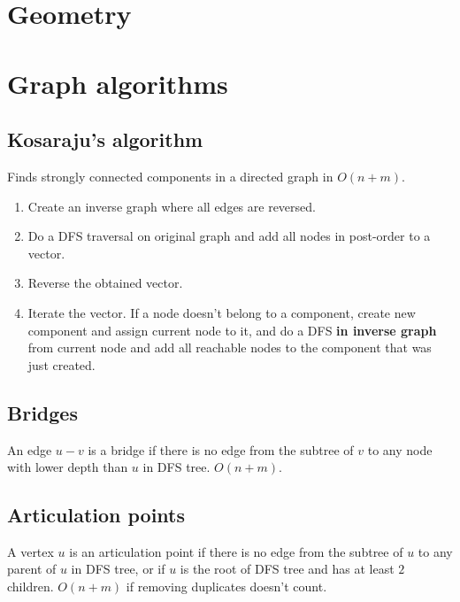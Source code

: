 \documentclass{article}
\begin{document}


\section {Geometry}



\section {Graph algorithms}

\subsection {Kosaraju's algorithm}

Finds strongly connected components in a directed graph in $O(n + m)$.

\begin{enumerate}
	\item Create an inverse graph where all edges are reversed.
	\item Do a DFS traversal on original graph and add all nodes in post-order to a vector.
	\item Reverse the obtained vector.
	\item Iterate the vector. If a node doesn't belong to a component, create new component and assign current node to it, and do a DFS \textbf{in inverse graph} from current node and add all reachable nodes to the component that was just created.
\end{enumerate}

\subsection {Bridges}

An edge $u-v$ is a bridge if there is no edge from the subtree of $v$ to any node with lower depth than $u$ in DFS tree. $O(n+m)$.



\subsection {Articulation points}

A vertex $u$ is an articulation point if there is no edge from the subtree of $u$ to any parent of $u$ in DFS tree, or if $u$ is the root of DFS tree and has at least $2$ children. $O(n+m)$ if removing duplicates doesn't count.
\end{document}
